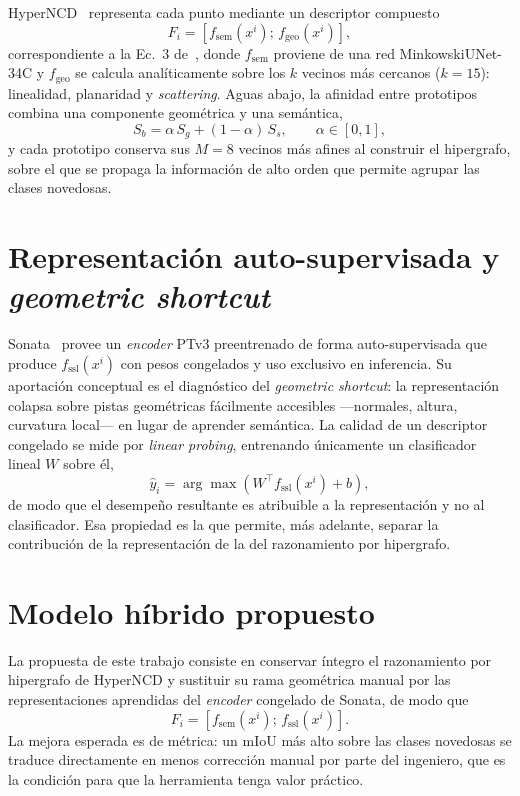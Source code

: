 HyperNCD~\cite{hyperncd} representa cada punto mediante un descriptor compuesto
\begin{equation}
F_i=\left[f_{\mathrm{sem}}(x^i);\,f_{\mathrm{geo}}(x^i)\right],
\label{eq:hyperncd3}
\end{equation}
correspondiente a la Ec.~3 de~\cite{hyperncd}, donde $f_{\mathrm{sem}}$ proviene
de una red MinkowskiUNet-34C y $f_{\mathrm{geo}}$ se calcula analíticamente sobre
los $k$ vecinos más cercanos ($k=15$): linealidad, planaridad y \emph{scattering}.
Aguas abajo, la afinidad entre prototipos combina una componente geométrica y una
semántica,
\begin{equation}
S_b=\alpha\,S_g+(1-\alpha)\,S_s,\qquad \alpha\in[0,1],
\label{eq:afinidad}
\end{equation}
y cada prototipo conserva sus $M=8$ vecinos más afines al construir el
hipergrafo, sobre el que se propaga la información de alto orden que permite
agrupar las clases novedosas.

\section{Representación auto-supervisada y \emph{geometric shortcut}}

Sonata~\cite{sonata} provee un \emph{encoder} PTv3 preentrenado de forma
auto-supervisada que produce $f_{\mathrm{ssl}}(x^i)$ con pesos congelados y uso
exclusivo en inferencia. Su aportación conceptual es el diagnóstico del
\emph{geometric shortcut}: la representación colapsa sobre pistas geométricas
fácilmente accesibles ---normales, altura, curvatura local--- en lugar de
aprender semántica. La calidad de un descriptor congelado se mide por
\emph{linear probing}, entrenando únicamente un clasificador lineal $W$ sobre él,
\begin{equation}
\hat{y}_i=\arg\max\left(W^{\top}f_{\mathrm{ssl}}(x^i)+b\right),
\label{eq:probe}
\end{equation}
de modo que el desempeño resultante es atribuible a la representación y no al
clasificador. Esa propiedad es la que permite, más adelante, separar la
contribución de la representación de la del razonamiento por hipergrafo.
\section{Modelo híbrido propuesto}

La propuesta de este trabajo consiste en conservar íntegro el razonamiento por
hipergrafo de HyperNCD y sustituir su rama geométrica manual por las
representaciones aprendidas del \emph{encoder} congelado de Sonata, de modo que
\begin{equation}
F_i=\left[f_{\mathrm{sem}}(x^i);\,f_{\mathrm{ssl}}(x^i)\right].
\label{eq:hibrido}
\end{equation}
La mejora esperada es de métrica: un mIoU más alto sobre las clases novedosas se
traduce directamente en menos corrección manual por parte del ingeniero, que es
la condición para que la herramienta tenga valor práctico.

